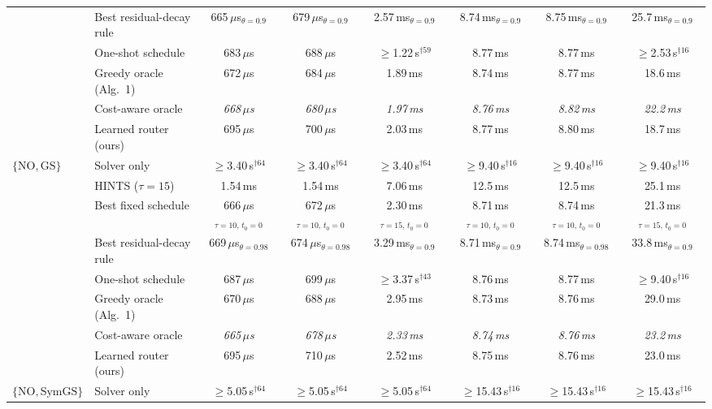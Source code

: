 {\begin{tabular}{llcccccc}
 & Best residual-decay rule & 665\,$\mu$s$_{\theta{=}0.9}$ & 679\,$\mu$s$_{\theta{=}0.9}$ & 2.57\,ms$_{\theta{=}0.9}$ & 8.74\,ms$_{\theta{=}0.9}$ & 8.75\,ms$_{\theta{=}0.9}$ & 25.7\,ms$_{\theta{=}0.9}$ \\
 & One-shot schedule & 683\,$\mu$s & 688\,$\mu$s & $\geq$1.22\,s$^{\dagger 59}$ & 8.77\,ms & 8.77\,ms & $\geq$2.53\,s$^{\dagger 16}$ \\
 & Greedy oracle (Alg.~1) & 672\,$\mu$s & 684\,$\mu$s & 1.89\,ms & 8.74\,ms & 8.77\,ms & 18.6\,ms \\
 & Cost-aware oracle & \textit{668\,$\mu$s} & \textit{680\,$\mu$s} & \textit{1.97\,ms} & \textit{8.76\,ms} & \textit{8.82\,ms} & \textit{22.2\,ms} \\
 & Learned router (ours) & 695\,$\mu$s & 700\,$\mu$s & 2.03\,ms & 8.77\,ms & 8.80\,ms & 18.7\,ms \\
\midrule
$\{\mathrm{NO}, \text{GS}\}$ & Solver only & $\geq$3.40\,s$^{\dagger 64}$ & $\geq$3.40\,s$^{\dagger 64}$ & $\geq$3.40\,s$^{\dagger 64}$ & $\geq$9.40\,s$^{\dagger 16}$ & $\geq$9.40\,s$^{\dagger 16}$ & $\geq$9.40\,s$^{\dagger 16}$ \\
 & HINTS ($\tau{=}15$) & 1.54\,ms & 1.54\,ms & 7.06\,ms & 12.5\,ms & 12.5\,ms & 25.1\,ms \\
 & Best fixed schedule & 666\,$\mu$s$_{\tau{=}10,\,t_0{=}0}$ & 672\,$\mu$s$_{\tau{=}10,\,t_0{=}0}$ & 2.30\,ms$_{\tau{=}15,\,t_0{=}0}$ & 8.71\,ms$_{\tau{=}10,\,t_0{=}0}$ & 8.74\,ms$_{\tau{=}10,\,t_0{=}0}$ & 21.3\,ms$_{\tau{=}15,\,t_0{=}0}$ \\
 & Best residual-decay rule & 669\,$\mu$s$_{\theta{=}0.98}$ & 674\,$\mu$s$_{\theta{=}0.98}$ & 3.29\,ms$_{\theta{=}0.9}$ & 8.71\,ms$_{\theta{=}0.9}$ & 8.74\,ms$_{\theta{=}0.98}$ & 33.8\,ms$_{\theta{=}0.9}$ \\
 & One-shot schedule & 687\,$\mu$s & 699\,$\mu$s & $\geq$3.37\,s$^{\dagger 43}$ & 8.76\,ms & 8.77\,ms & $\geq$9.40\,s$^{\dagger 16}$ \\
 & Greedy oracle (Alg.~1) & 670\,$\mu$s & 688\,$\mu$s & 2.95\,ms & 8.73\,ms & 8.76\,ms & 29.0\,ms \\
 & Cost-aware oracle & \textit{665\,$\mu$s} & \textit{678\,$\mu$s} & \textit{2.33\,ms} & \textit{8.74\,ms} & \textit{8.76\,ms} & \textit{23.2\,ms} \\
 & Learned router (ours) & 695\,$\mu$s & 710\,$\mu$s & 2.52\,ms & 8.75\,ms & 8.76\,ms & 23.0\,ms \\
\midrule
$\{\mathrm{NO}, \text{SymGS}\}$ & Solver only & $\geq$5.05\,s$^{\dagger 64}$ & $\geq$5.05\,s$^{\dagger 64}$ & $\geq$5.05\,s$^{\dagger 64}$ & $\geq$15.43\,s$^{\dagger 16}$ & $\geq$15.43\,s$^{\dagger 16}$ & $\geq$15.43\,s$^{\dagger 16}$ \\

\end{tabular}}
